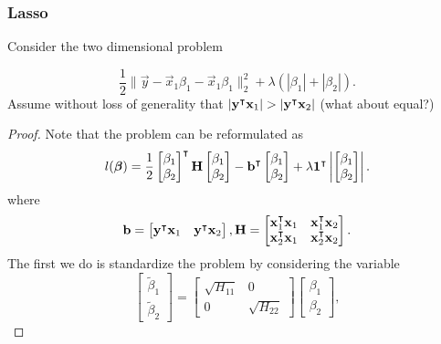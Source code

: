 \subsubsection{Lasso}
Consider the two dimensional problem

\[
  \frac 1 2 \lVert \vec{y} - \vec{x}_1 \beta_1 -\vec{x}_1 \beta_1 \rVert_2^2 + \lambda \left( | \beta_1 | + |\beta_2| \right).
\]
Assume without loss of generality that $|\mv{y}^\T\mv{x}_1|> |\mv{y}^\T\mv{x}_2|$ (what about equal?)
\begin{proof}
  Note that the problem can be reformulated as
  \[ l({\boldsymbol{\mathrm{\beta}}}) =
    \frac 1 2 \begin{bmatrix}
      \beta_1 \\ \beta_2
    \end{bmatrix}^\intercal {\boldsymbol{\mathrm{H}}} \begin{bmatrix}
      \beta_1 \\ \beta_2
    \end{bmatrix}  -
    {\boldsymbol{\mathrm{b}}}^\intercal \begin{bmatrix}
      \beta_1 \\ \beta_2
    \end{bmatrix} + \lambda  {\boldsymbol{\mathrm{1}}}^\intercal \left| \begin{bmatrix}
      \beta_1 \\ \beta_2
    \end{bmatrix}  \right|.
  \]
  where
  $$
    {\boldsymbol{\mathrm{b}}} = \begin{bmatrix}
      {\boldsymbol{\mathrm{y}}}^\intercal {\boldsymbol{\mathrm{x}}}_1 & {\boldsymbol{\mathrm{y}}}^\intercal {\boldsymbol{\mathrm{x}}}_2
    \end{bmatrix} , {\boldsymbol{\mathrm{H}}}  =
    \begin{bmatrix}
      {\boldsymbol{\mathrm{x}}}_1^\intercal {\boldsymbol{\mathrm{x}}}_1 & {\boldsymbol{\mathrm{x}}}_1^\intercal {\boldsymbol{\mathrm{x}}}_2 \\
      {\boldsymbol{\mathrm{x}}}_2^\intercal {\boldsymbol{\mathrm{x}}}_1 & {\boldsymbol{\mathrm{x}}}_2^\intercal {\boldsymbol{\mathrm{x}}}_2 \\
    \end{bmatrix} .
  $$
  The first we do is standardize the problem by considering the variable
  $$
    \begin{bmatrix}
      \tilde	\beta_1 \\ \tilde \beta_2
    \end{bmatrix} =  \begin{bmatrix}
      \sqrt{H_{11}} & 0             \\
      0             & \sqrt{H_{22}}
    \end{bmatrix} \begin{bmatrix}
      \beta_1 \\ \beta_2
    \end{bmatrix},
$$
\end{proof}
